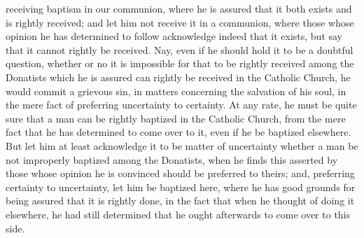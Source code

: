 receiving baptism in our communion, where he is assured that it both exists and is rightly received; and let him not receive it in a communion, where those whose opinion he has determined to follow acknowledge indeed that it exists, but say that it cannot rightly be received. Nay, even if he should hold it to be a doubtful question, whether or no it is impossible for that to be rightly received among the Donatists which he is assured can rightly be received in the Catholic Church, he would commit a grievous sin, in matters concerning the salvation of his soul, in the mere fact of preferring uncertainty to certainty. At any rate, he must be quite sure that a man can be rightly baptized in the Catholic Church, from the mere fact that he has determined to come over to it, even if he be baptized elsewhere. But let him at least acknowledge it to be matter of uncertainty whether a man be not improperly baptized among the Donatists, when he finds this asserted by those whose opinion he is convinced should be preferred to theirs; and, preferring certainty to uncertainty, let him be baptized here, where he has good grounds for being assured that it is rightly done, in the fact that when he thought of doing it elsewhere, he had still determined that he ought afterwards to come over to this side.


